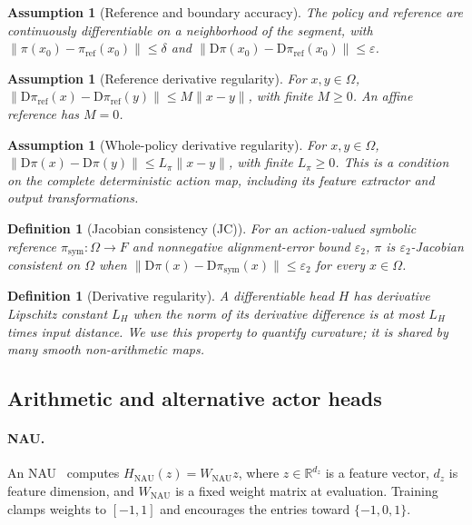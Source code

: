 \documentclass[10pt]{article}
\newtheorem{definition}[theorem]{Definition}
\newtheorem{assumption}[theorem]{Assumption}
\begin{document}
\begin{assumption}[Reference and boundary accuracy]
\label{assump:reference}
The policy and reference are continuously differentiable on a neighborhood of the segment, with
$\|\pi(x_0)-\pi_{\mathrm{ref}}(x_0)\|\leq\delta$ and
$\|\mathrm{D}\pi(x_0)-\mathrm{D}\pi_{\mathrm{ref}}(x_0)\|\leq\varepsilon$.
\end{assumption}

\begin{assumption}[Reference derivative regularity]
\label{assump:smooth}
For $x,y\in\Omega$,
$\|\mathrm{D}\pi_{\mathrm{ref}}(x)-\mathrm{D}\pi_{\mathrm{ref}}(y)\|
\leq M\|x-y\|$, with finite $M\geq0$.
An affine reference has $M=0$.
\end{assumption}

\begin{assumption}[Whole-policy derivative regularity]
\label{assump:feature_lip}
For $x,y\in\Omega$,
$\|\mathrm{D}\pi(x)-\mathrm{D}\pi(y)\|\leq L_\pi\|x-y\|$,
with finite $L_\pi\geq0$.
This is a condition on the complete deterministic action map, including its feature extractor and output transformations.
\end{assumption}

\begin{definition}[Jacobian consistency (JC)]
\label{def:jac_consistency}
For an action-valued symbolic reference $\pi_{\mathrm{sym}}:\Omega\to F$ and nonnegative alignment-error bound $\varepsilon_2$, $\pi$ is $\varepsilon_2$-Jacobian consistent on $\Omega$ when
$\|\mathrm{D}\pi(x)-\mathrm{D}\pi_{\mathrm{sym}}(x)\|\leq\varepsilon_2$
for every $x\in\Omega$.
\end{definition}

\begin{definition}[Derivative regularity]
\label{def:arith_bias}
A differentiable head $H$ has derivative Lipschitz constant $L_H$ when the norm of its derivative difference is at most $L_H$ times input distance. We use this property to quantify curvature; it is shared by many smooth non-arithmetic maps.
\end{definition}

\subsection{Arithmetic and alternative actor heads}
\label{sec:nau}

\paragraph{NAU.}
An NAU~\cite{Madsen2020NAU} computes
$H_{\mathrm{NAU}}(z)=W_{\mathrm{NAU}}z$,
where $z\in\mathbb{R}^{d_z}$ is a feature vector, $d_z$ is feature dimension, and $W_{\mathrm{NAU}}$ is a fixed weight matrix at evaluation. Training clamps weights to $[-1,1]$ and encourages the entries toward $\{-1,0,1\}$.
\end{document}
